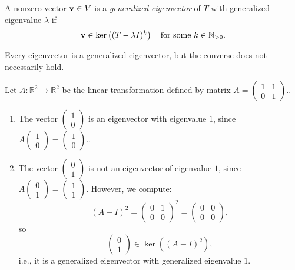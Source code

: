 \begin{definition}\label{def:generalized-eigen}
A nonzero vector \({\bf v} \in V\) is a \emph{generalized eigenvector} of \(T\) with generalized eigenvalue \(\lambda\) if
\[
{\bf v} \in \ker\left( (T - \lambda I)^k \right)
\quad \text{for some } k \in \mathbb{N}_{>0}.
\]
\end{definition}

\begin{remark}
Every eigenvector is a generalized eigenvector, but the converse does not necessarily hold.
\end{remark}

\begin{example}
Let \( A : \mathbb{R}^2 \to \mathbb{R}^2 \) be the linear transformation defined by matrix 
\(A = \begin{pmatrix}
1 & 1 \\
0 & 1
\end{pmatrix}.
\).
\begin{enumerate}
  \item The vector \( \begin{pmatrix} 1 \\ 0 \end{pmatrix} \) is an eigenvector with eigenvalue \(1\), since
  \(
  A \begin{pmatrix} 1 \\ 0 \end{pmatrix} = \begin{pmatrix} 1 \\ 0 \end{pmatrix}.
  \).
  
  \item The vector \( \begin{pmatrix} 0 \\ 1 \end{pmatrix} \) is not an eigenvector of eigenvalue $1$, since
  \(
  A \begin{pmatrix} 0 \\ 1 \end{pmatrix} = \begin{pmatrix} 1 \\ 1 \end{pmatrix}.
  \)
  However, we compute:
  \[
  (A - I)^2 = \begin{pmatrix} 0 & 1 \\ 0 & 0 \end{pmatrix}^2 = \begin{pmatrix} 0 & 0 \\ 0 & 0 \end{pmatrix},
  \]
  so
  \[
  \begin{pmatrix} 0 \\ 1 \end{pmatrix} \in \ker((A - I)^2),
  \]
  i.e., it is a generalized eigenvector with generalized eigenvalue \(1\).
\end{enumerate}
\end{example}


